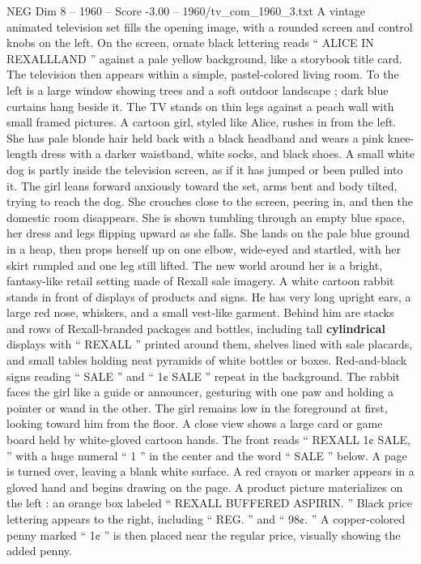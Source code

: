 \begin{textsample}{NEG Dim 8 – 1960 – Score -3.00 – 1960/tv\_com\_1960\_3.txt}  \label{ex:f8_neg_004}
A vintage animated television set fills the opening image, with a rounded screen and control knobs on the left.
On the screen, ornate black lettering reads “ ALICE IN REXALLLAND ” against a pale yellow background, like a storybook title card.
The television then appears within a simple, pastel-colored living room.
To the left is a large window showing trees and a soft outdoor landscape ; dark blue curtains hang beside it.
The TV stands on thin legs against a peach wall with small framed pictures.
A cartoon girl, styled like Alice, rushes in from the left.
She has pale blonde hair held back with a black headband and wears a pink knee-length dress with a darker waistband, white socks, and black shoes.
A small white dog is partly inside the television screen, as if it has jumped or been pulled into it.
The girl leans forward anxiously toward the set, arms bent and body tilted, trying to reach the dog.
She crouches close to the screen, peering in, and then the domestic room disappears.
She is shown tumbling through an empty blue space, her dress and legs flipping upward as she falls.
She lands on the pale blue ground in a heap, then props herself up on one elbow, wide-eyed and startled, with her skirt rumpled and one leg still lifted.
The new world around her is a bright, fantasy-like retail setting made of Rexall sale imagery.
A white cartoon rabbit stands in front of displays of products and signs.
He has very long upright ears, a large red nose, whiskers, and a small vest-like garment.
Behind him are stacks and rows of Rexall-branded packages and bottles, including tall \textbf{cylindrical} displays with “ REXALL ” printed around them, shelves lined with sale placards, and small tables holding neat pyramids of white bottles or boxes.
Red-and-black signs reading “ SALE ” and “ 1¢ SALE ” repeat in the background.
The rabbit faces the girl like a guide or announcer, gesturing with one paw and holding a pointer or wand in the other.
The girl remains low in the foreground at first, looking toward him from the floor.
A close view shows a large card or game board held by white-gloved cartoon hands.
The front reads “ REXALL 1¢ SALE, ” with a huge numeral “ 1 ” in the center and the word “ SALE ” below.
A page is turned over, leaving a blank white surface.
A red crayon or marker appears in a gloved hand and begins drawing on the page.
A product picture materializes on the left : an orange box labeled “ REXALL BUFFERED ASPIRIN. ” Black price lettering appears to the right, including “ REG. ” and “ 98¢. ” A copper-colored penny marked “ 1¢ ” is then placed near the regular price, visually showing the added penny.

\end{textsample}
